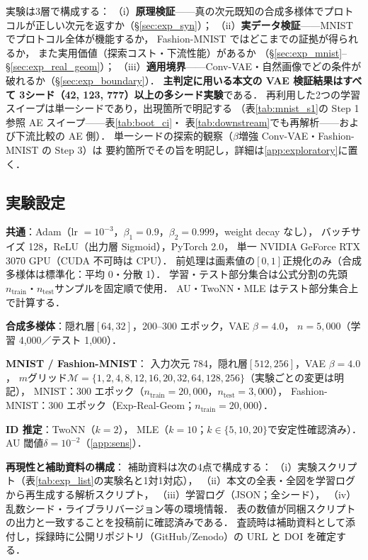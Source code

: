 \documentclass[11pt,a4paper]{jsarticle}
\begin{document}
実験は3層で構成する：
（i）\textbf{原理検証}——真の次元既知の合成多様体でプロトコルが正しい次元を返すか（§\ref{sec:exp_syn}）；
（ii）\textbf{実データ検証}——MNIST でプロトコル全体が機能するか，
Fashion-MNIST ではどこまでの証拠が得られるか，
また実用価値（探索コスト・下流性能）があるか
（§\ref{sec:exp_mnist}--§\ref{sec:exp_real_geom}）；
（iii）\textbf{適用境界}——Conv-VAE・自然画像でどの条件が破れるか（§\ref{sec:exp_boundary}）．
\textbf{主判定に用いる本文の VAE 検証結果はすべて
3シード（42, 123, 777）以上の多シード実験}である．
再利用した2つの学習スイープは単一シードであり，出現箇所で明記する
（表\ref{tab:mnist_s1}の Step 1 参照 AE スイープ——表\ref{tab:boot_ci}・
表\ref{tab:downstream}でも再解析——および下流比較の AE 側）．
単一シードの探索的観察（$\beta$増強 Conv-VAE・Fashion-MNIST の Step 3）は
要約箇所でその旨を明記し，詳細は\ref{app:exploratory}に置く．

\subsection{実験設定}\label{sec:exp_setup}

\textbf{共通}：Adam（lr $= 10^{-3}$，$\beta_1 = 0.9$，$\beta_2 = 0.999$，weight decay なし），
バッチサイズ 128，ReLU（出力層 Sigmoid），PyTorch 2.0，
単一 NVIDIA GeForce RTX 3070 GPU（CUDA 不可時は CPU）．
前処理は画素値の$[0,1]$正規化のみ（合成多様体は標準化：平均 0・分散 1）．
学習・テスト部分集合は公式分割の先頭$n_{\mathrm{train}}$・$n_{\mathrm{test}}$サンプルを固定順で使用．
AU・TwoNN・MLE はテスト部分集合上で計算する．

\textbf{合成多様体}：隠れ層$[64, 32]$，200--300 エポック，VAE $\beta = 4.0$，
$n = 5{,}000$（学習 4,000／テスト 1,000）．

\textbf{MNIST\cite{lecun1998} / Fashion-MNIST\cite{xiao2017fashion}}：
入力次元 784，隠れ層$[512, 256]$，VAE $\beta = 4.0$，
$m$グリッド$\mathcal{M} = \{1, 2, 4, 8, 12, 16, 20, 32, 64, 128, 256\}$（実験ごとの変更は明記），
MNIST：300 エポック（$n_{\mathrm{train}} = 20{,}000$，$n_{\mathrm{test}} = 3{,}000$），
Fashion-MNIST：300 エポック（Exp-Real-Geom；$n_{\mathrm{train}} = 20{,}000$）．

\textbf{ID 推定}：TwoNN（$k = 2$）\cite{facco2017twonn}，
MLE（$k = 10$；$k \in \{5, 10, 20\}$で安定性確認済み）\cite{levina2005mle}．
AU 閾値$\delta = 10^{-2}$（\ref{app:sens}）．

\textbf{再現性と補助資料の構成}：
補助資料は次の4点で構成する：
（i）実験スクリプト（表\ref{tab:exp_list}の実験名と1対1対応），
（ii）本文の全表・全図を学習ログから再生成する解析スクリプト，
（iii）学習ログ（JSON；全シード），
（iv）乱数シード・ライブラリバージョン等の環境情報．
表の数値が同梱スクリプトの出力と一致することを投稿前に確認済みである．
査読時は補助資料として添付し，採録時に公開リポジトリ（GitHub/Zenodo）の
URL と DOI を確定する．
\end{document}
